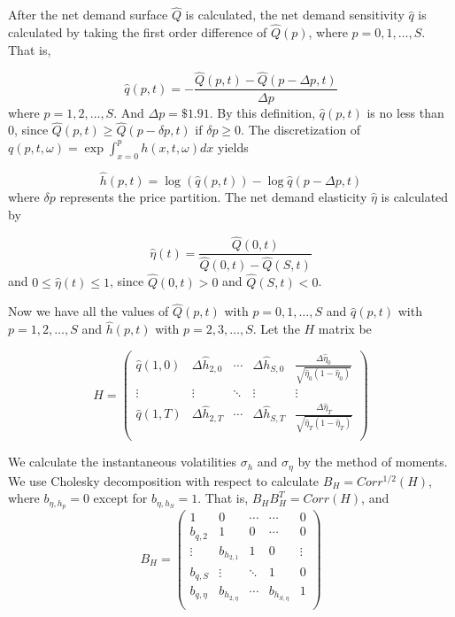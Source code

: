 \documentclass{article}
\begin{document}
After the net demand surface $\hat{Q}$ is calculated, the net demand sensitivity $\hat{q}$ is calculated by taking the first order difference of $\hat{Q}(p)$, where $p = 0,1,\ldots,S$. That is,

$$
\hat{q}(p,t) = - \frac{\hat{Q}(p, t) - \hat{Q}(p - \Delta p, t)}{\Delta p}
$$
where $p=1,2,\ldots,S$. And $\Delta p = \$1.91$. By this definition, $\hat{q}(p,t)$ is no less than 0, since $\hat{Q}(p, t) \geq \hat{Q}(p - \delta p, t)$ if $\delta p \geq 0$. The discretization of  $q(p,t,\omega ) =\exp{\int_{x=0}^{p}h(x,t,\omega )dx}$ yields

$$
\hat{h}(p,t) = \log(\hat{q}(p,t)) - \log{\hat{q}(p-\Delta p,t)}
$$
where $\delta p$ represents the price partition. The net demand elasticity $\hat{\eta}$ is calculated by

$$
\hat{\eta}(t) = \frac{\hat{Q}(0, t)}{\hat{Q}(0, t) - \hat{Q}(S, t)}
$$
and $0 \leq \hat{\eta}(t) \leq 1$, since $\hat{Q}(0, t) > 0$ and $\hat{Q}(S, t)<0$.

Now we have all the values of $\hat{Q}(p,t)$ with $p = 0,1,\ldots, S$ and $\hat{q}(p,t)$ with $p = 1,2,\ldots, S$ and $\hat{h}(p,t)$ with $p = 2,3,\ldots, S$. Let the $H$ matrix be

$$
H =
\left(
  \begin{array}{ccccc}
    \hat{q}(1,0) & \Delta \hat{h}_{2,0} & \cdots & \Delta \hat{h}_{S,0} & \frac{\Delta \hat{\eta}_{0}}{\sqrt{\hat{\eta}_{0}(1-\hat{\eta}_{0})}} \\
    \vdots & \vdots & \ddots & \vdots & \vdots \\
    \hat{q}(1,T) & \Delta \hat{h}_{2,T} & \cdots & \Delta \hat{h}_{S,T} & \frac{\Delta \hat{\eta}_{T}}{\sqrt{\hat{\eta}_{T}(1-\hat{\eta}_{T})}}  \\
  \end{array}
\right)
$$

We calculate the instantaneous volatilities $\sigma_h$ and $\sigma_{\eta}$ by the method of moments. We use Cholesky decomposition with respect to calculate $B_{H}=Corr^{1/2}(H)$, where $b_{\eta,h_p}=0$ except for $b_{\eta,h_S}=1$. That is, $B_H B_H^T = Corr(H)$, and 
$$
B_H = 
\left(
  \begin{array}{ccccc}
    1 & 0 & \cdots & \cdots & 0 \\
    b_{q,2} & 1 & 0 & \cdots & 0 \\
    \vdots & b_{h_{2,1}} & 1 & 0 & \vdots \\
    b_{q,S} & \vdots & \ddots & 1 & 0 \\
    b_{q,\eta} & b_{h_{2,\eta}} & \cdots & b_{h_{S,\eta}} & 1 \\
  \end{array}
\right)
$$
\end{document}
